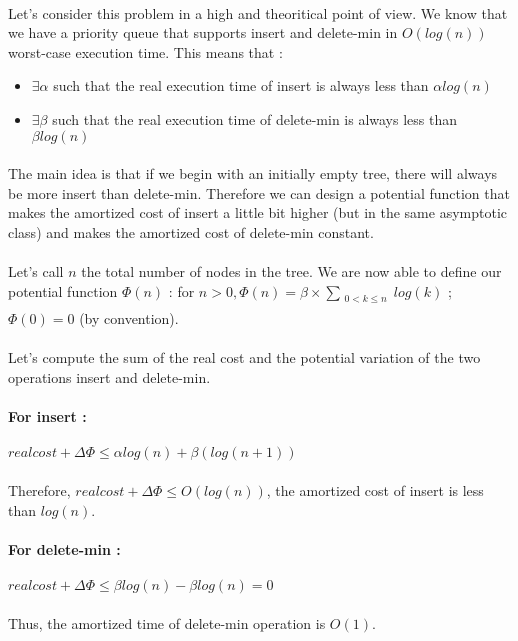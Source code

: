 \paragraph{}
Let's consider this problem in a high and theoritical point of view. We know that we have a priority queue that supports insert and delete-min in $O(log(n))$ worst-case execution time. This means that :
\begin{itemize}
	\item $\exists \alpha$ such that the real execution time of insert is always less than $\alpha log(n)$
	\item $\exists \beta$ such that the real execution time of delete-min is always less than $\beta log(n)$
\end{itemize}
\paragraph{}
The main idea is that if we begin with an initially empty tree, there will always be more insert than delete-min. Therefore we can design a potential function that makes the amortized cost of insert a little bit higher (but in the same asymptotic class) and makes the amortized cost of delete-min constant.
\paragraph{}
Let's call $n$ the total number of nodes in the tree. We are now able to define our potential function $\Phi(n)$ :
for $ n > 0, \Phi(n) = \beta \times \sum_{\substack{0<k\leqslant n \\}}log(k)   $ ; $ \Phi(0) = 0 $ (by convention).

\paragraph{}
Let's compute the sum of the real cost and the potential variation of the two operations insert and delete-min.

\paragraph{For insert :}
\paragraph{}
$real cost + \Delta\Phi \leqslant \alpha log(n) + \beta(log(n+1))$

\paragraph{}
Therefore, $real cost + \Delta\Phi \leqslant O(log(n))$, the amortized cost of insert is less than $log(n)$.

\paragraph{For delete-min  :}
\paragraph{}
$real cost + \Delta\Phi \leqslant \beta log(n) - \beta log(n) =  0$

\paragraph{}
Thus, the amortized time of delete-min operation is $O(1)$.
